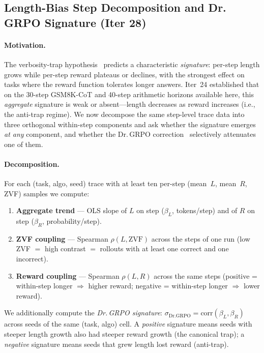 \subsection{Length-Bias Step Decomposition and Dr.\,GRPO Signature (Iter 28)}
\label{sec:length-bias-iter28}

\paragraph{Motivation.}
The verbosity-trap hypothesis~\cite{tong2025drgrpo} predicts a
characteristic \emph{signature}: per-step length grows while per-step reward
plateaus or declines, with the strongest effect on tasks where the reward
function tolerates longer answers. Iter~24 established that on the
30-step GSM8K-CoT and 40-step arithmetic horizons available here, this
\emph{aggregate} signature is weak or absent---length decreases as reward
increases (i.e., the anti-trap regime). We now decompose the same
step-level trace data into three orthogonal within-step components and ask
whether the signature emerges \emph{at any} component, and whether the
Dr.\,GRPO correction~\cite{tong2025drgrpo} selectively attenuates one of
them.

\paragraph{Decomposition.}
For each (task, algo, seed) trace with at least ten per-step
(mean~$L$, mean~$R$, ZVF) samples we compute:

\begin{enumerate}
\item \textbf{Aggregate trend} --- OLS slope of $L$ on step
  ($\beta_L$, tokens/step) and of $R$ on step
  ($\beta_R$, probability/step).
\item \textbf{ZVF coupling} --- Spearman $\rho(L, \mathrm{ZVF})$ across
  the steps of one run (low ZVF $=$ high contrast $=$ rollouts
  with at least one correct and one incorrect).
\item \textbf{Reward coupling} --- Spearman $\rho(L, R)$ across the same
  steps (positive = within-step longer $\Rightarrow$ higher reward;
  negative = within-step longer $\Rightarrow$ lower reward).
\end{enumerate}

We additionally compute the \emph{Dr.\,GRPO signature}:
$\sigma_{\mathrm{Dr.GRPO}} = \mathrm{corr}(\beta_L, \beta_R)$ across seeds
of the same (task, algo) cell. A \emph{positive} signature means seeds
with steeper length growth also had steeper reward growth (the
canonical trap); a \emph{negative} signature means seeds that grew
length lost reward (anti-trap).

